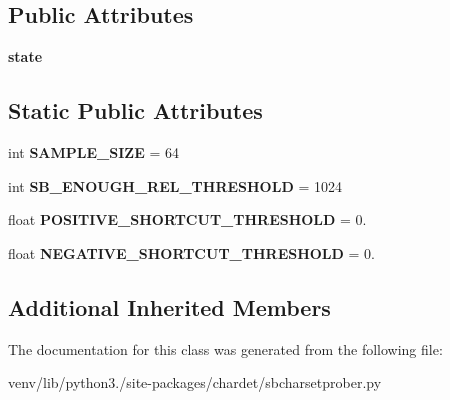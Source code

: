 \subsection*{Public Attributes}
\begin{DoxyCompactItemize}
\item 
\mbox{\label{classchardet_1_1sbcharsetprober_1_1_single_byte_char_set_prober_a94e6078166625233f1296b6ec1482f15}} 
{\bfseries state}
\end{DoxyCompactItemize}
\subsection*{Static Public Attributes}
\begin{DoxyCompactItemize}
\item 
\mbox{\label{classchardet_1_1sbcharsetprober_1_1_single_byte_char_set_prober_ac62dfa4e1ee24171c622303eb541462d}} 
int {\bfseries S\+A\+M\+P\+L\+E\+\_\+\+S\+I\+ZE} = 64
\item 
\mbox{\label{classchardet_1_1sbcharsetprober_1_1_single_byte_char_set_prober_a400a005141e47c48297b2702f84b8e4f}} 
int {\bfseries S\+B\+\_\+\+E\+N\+O\+U\+G\+H\+\_\+\+R\+E\+L\+\_\+\+T\+H\+R\+E\+S\+H\+O\+LD} = 1024
\item 
\mbox{\label{classchardet_1_1sbcharsetprober_1_1_single_byte_char_set_prober_a74bf34dd30e0e4bdb4f4acea56ff1293}} 
float {\bfseries P\+O\+S\+I\+T\+I\+V\+E\+\_\+\+S\+H\+O\+R\+T\+C\+U\+T\+\_\+\+T\+H\+R\+E\+S\+H\+O\+LD} = 0.
\item 
\mbox{\label{classchardet_1_1sbcharsetprober_1_1_single_byte_char_set_prober_a8055db0ac2c0829b3fb098c86ab10577}} 
float {\bfseries N\+E\+G\+A\+T\+I\+V\+E\+\_\+\+S\+H\+O\+R\+T\+C\+U\+T\+\_\+\+T\+H\+R\+E\+S\+H\+O\+LD} = 0.
\end{DoxyCompactItemize}
\subsection*{Additional Inherited Members}


The documentation for this class was generated from the following file\+:\begin{DoxyCompactItemize}
\item 
venv/lib/python3./site-\/packages/chardet/sbcharsetprober.\+py\end{DoxyCompactItemize}
